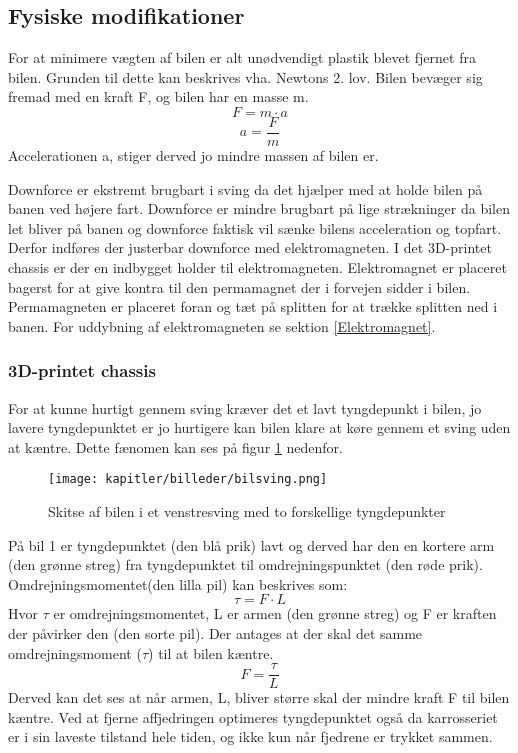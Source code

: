 
\subsection{Fysiske modifikationer}

For at minimere vægten af bilen er alt unødvendigt plastik blevet fjernet fra bilen. Grunden til dette kan beskrives vha. Newtons 2. lov. Bilen bevæger sig fremad med en kraft F, og bilen har en masse m. 
\begin{equation}
F=m \cdot a
\end{equation}
\begin{equation}
a = \frac{F}{m}
\end{equation}
Accelerationen a, stiger derved jo mindre massen af bilen er. 

Downforce er ekstremt brugbart i sving da det hjælper med at holde bilen på banen ved højere fart. Downforce er mindre brugbart på lige strækninger da bilen let bliver på banen og downforce faktisk vil sænke bilens acceleration og topfart. Derfor indføres der justerbar downforce med elektromagneten. I det 3D-printet chassis er der en indbygget holder til elektromagneten. Elektromagnet er placeret bagerst for at give kontra til den permamagnet der i forvejen sidder i bilen. Permamagneten er placeret foran og tæt på splitten for at trække splitten ned i banen. For uddybning af elektromagneten se sektion \ref{Elektromagnet}.

\subsubsection{3D-printet chassis}

For at kunne hurtigt gennem sving kræver det et lavt tyngdepunkt i bilen, jo lavere tyngdepunktet er jo hurtigere kan bilen klare at køre gennem et sving uden at kæntre. Dette fænomen kan ses på figur \ref{fig:bilsving} nedenfor.
\begin{figure}[ht]
    \centering
    \texttt{[image: kapitler/billeder/bilsving.png]}
    \caption{Skitse af bilen i et venstresving med to forskellige tyngdepunkter}
    \label{fig:bilsving}
\end{figure}
På bil 1 er tyngdepunktet (den blå prik) lavt og derved har den en kortere arm (den grønne streg) fra tyngdepunktet til omdrejningspunktet (den røde prik). Omdrejningsmomentet(den lilla pil) kan beskrives som:
\begin{equation}
\tau = F \cdot L
\end{equation}
Hvor $\tau$ er omdrejningsmomentet, L er armen (den grønne streg) og F er kraften der påvirker den (den sorte pil). Der antages at der skal det samme omdrejningsmoment ($\tau$) til at bilen kæntre.
\begin{equation}
F = \frac{\tau}{L}
\end{equation}
Derved kan det ses at når armen, L, bliver større skal der mindre kraft F til bilen kæntre. 
Ved at fjerne affjedringen optimeres tyngdepunktet også da karrosseriet er i sin laveste tilstand hele tiden, og ikke kun når fjedrene er trykket sammen.

